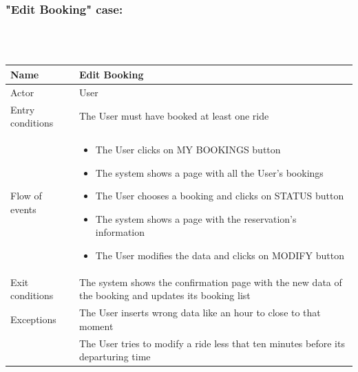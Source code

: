 \newpage

\subsubsection{"Edit Booking" case:}
\hfill \\
\\
\begin{tabular}{|p{3cm}|p{10cm}|}
\hline
Name & Edit Booking\\
\hline
Actor & User\\
\hline
Entry conditions & The User must have booked at least one ride\\
\hline
Flow of events &
	\begin{itemize}
			\item The User clicks on MY BOOKINGS button
			\item The system shows a page with all the User's bookings
			\item The User chooses a booking and clicks on STATUS button
			\item The system shows a page with the reservation's information
			\item The User modifies the data and clicks on MODIFY button
	\end{itemize}\\
\hline
Exit conditions & The system shows the confirmation page with the new data of the booking and updates its booking list\\
\hline
Exceptions & The User inserts wrong data like an hour to close to that moment\\
			& The User tries to modify a ride less that ten minutes before its departuring time\\
\hline
\end {tabular}


\newpage
